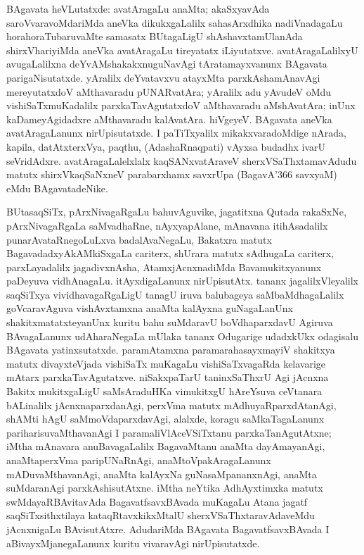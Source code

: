 BAgavata heVLutatxde: avatAragaLu anaMta; akaSxyavAda saroVvaravoMda\-riMda aneVka dikukxgaLalilx sahasArxdhika nadiVnadagaLu horahoraTubaruvaMte samasatx BUta\-gaLigU shAshavxtamUlanAda shirxVhariyiMda aneVka avatAragaLu tireyatatx iLiyutatxve. avatAragaLalilxyU avugaLalilxna deYvAMshakakxnuguNavAgi tAratamayxvanunx BAgavata parigaNisutatxde. yAralilx deYvatavxvu atayxMta parxkAshamAnavAgi mereyutatxdoV aMthavaradu pUNARvatAra; yAralilx adu yAvudeV oMdu vishiSaTxmuKadalilx parxkaTavAgu\-tatxdoV aMthavaradu aMshAvatAra; inUnx kaDameyAgidadxre aMthavaradu kalAvatAra. hiVgeyeV. BAgavata aneVka avatAragaLanunx nirUpisutatxde. I paTiTxyalilx mikakxvara\-doMdige nArada, kapila, datAtxterxVya, paqthu, (AdashaRnaqpati) vAyxsa budadhx ivarU seVridAdxre. avatAragaLalelxlalx kaqSANxvatAraveV sherxVSaThxtamavAdudu matutx \hbox{shirxVkaqSaNxneV} para\-barxhamx savxrUpa (BagavA\char'366 savxyaM) eMdu BAgavatadeNike. 

BUtasaqSiTx, pArxNivagaRgaLu bahuvAguvike, jagatitxna Qutada rakaSxNe, pArxNivagaR\-gaLa saMvadhaRne, nAyxyapAlane, mAnavana itihAsadalilx punarAvataRnegoLuLxva badalA\-vaNegaLu, Bakatxra matutx BagavadadxyAkAMkiSxgaLa cariterx, shUrara matutx sAdhugaLa cariterx, parxLayadalilx jagadivxnAsha, AtamxjAcnxnadiMda Bavamukitxyanunx paDeyuva vidhAnagaLu. itAyxdigaLanunx nirUpisutAtx. tananx jagalilxVleyalilx saqSiTxya vividhavagaRgaLigU tanagU iruva balubageya saMbaMdhagaLalilx goVcaravAguva vishAvxtamxna anaMta kalAyxna guNagaLanUnx shakitxmatatxteyanUnx kuritu bahu suMdaravU boVdhaparxdavU Agiruva BAvagaLanunx udAharaNegaLa mUlaka tananx Odugarige udadxkUkx odagisalu BAgavata yatinxsutatxde. paramAtamxna paramarahasayxmayiV shakitxya matutx divayxteVjada vishiSaTx muKagaLu vishiSaTxvagaRda kelavarige mAtarx parxkaTavAgutatxve. niSakxpaTarU taninxSaThxrU Agi jAcnxna Bakitx mukitxgaLigU saMsAraduHKa vimukitxgU hAreYsuva ceVtanara bALinalilx jAcnxnaparxdanAgi, perxVma matutx mAdhuyaRparxdAtanAgi, shAMti hAgU saMmoVdaparxdavAgi, alalxde, koragu saMkaTagaLanunx pariharisuvaMthavanAgi I paramaliVlAceVSiTxtanu parxkaTanAgutAtxne; iMtha mAnavara anuBavagaLalilx BagavaMtanu anaMta dayAmayanAgi, anaMtaperxVma paripUNaRnAgi, anaMtoVpakAragaLanunx mADuvaMthavanAgi, anaMta kalAyxNa guNasaMpananxnAgi, anaMta suMdaranAgi parxkAshisutAtxne. iMtha neYtika AdhAyxtimxka matutx swMdayaRBAvitavAda BagavatfsavxBAvada muKagaLu Atana jagatf saqSiTxsithxtilaya kataqRtavxkikxMtalU sherxVSaThxtaravAdaveMdu jAcnxnigaLu BAvisutAtxre. AdudariMda BAgavata BagavatfsavxBAvada I aBivayxMjanegaLanunx kuritu vivaravAgi nirUpisutatxde.

